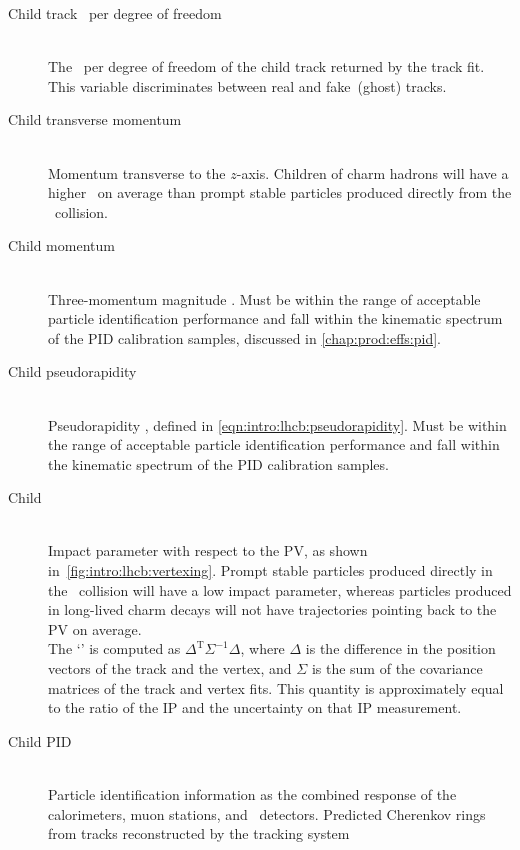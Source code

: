 \begin{description}
  \item[Child track \chisq\ per degree of freedom] \hfill \\
    The \chisq\ per degree of freedom of the child track returned by the track 
    fit.
    This variable discriminates between real and fake~(ghost) tracks.
  \item[Child transverse momentum] \hfill \\
    Momentum transverse to the $z$-axis.
    Children of charm hadrons will have a higher \pT\ on average than prompt 
    stable particles produced directly from the \pp\ collision.
  \item[Child momentum] \hfill \\
    Three-momentum magnitude \ptot.
    Must be within the range of acceptable particle identification performance 
    and fall within the kinematic spectrum of the \ac{PID} calibration samples, 
    discussed in \cref{chap:prod:effs:pid}.
  \item[Child pseudorapidity] \hfill \\
    Pseudorapidity \Eta, defined in \cref{eqn:intro:lhcb:pseudorapidity}.
    Must be within the range of acceptable particle identification performance 
    and fall within the kinematic spectrum of the \ac{PID} calibration samples.
  \item[Child \ipchisq] \hfill \\
    Impact parameter with respect to the \ac{PV}, as shown 
    in~\cref{fig:intro:lhcb:vertexing}.
    Prompt stable particles produced directly in the \pp\ collision will have a 
    low impact parameter, whereas particles produced in long-lived charm decays 
    will not have trajectories pointing back to the \ac{PV} on average.\\
    The `\chisq' is computed as $\Delta^{\text{T}}\Sigma^{-1}\Delta$, where 
    $\Delta$ is the difference in the position vectors of the track and the 
    vertex, and $\Sigma$ is the sum of the covariance matrices of the track and 
    vertex fits.
    This quantity is approximately equal to the ratio of the \ac{IP} and the 
    uncertainty on that \ac{IP} measurement.
  \item[Child \ac{PID}] \hfill \\
    Particle identification information as the combined response of the 
    calorimeters, muon stations, and \rich\ detectors.
    Predicted Cherenkov rings from tracks reconstructed by the tracking system 

\end{description}

